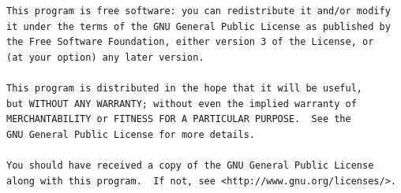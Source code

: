 \documentclass[a4paper,12pt]{article}
\begin{document}
\begin{verbatim}
This program is free software: you can redistribute it and/or modify
it under the terms of the GNU General Public License as published by
the Free Software Foundation, either version 3 of the License, or
(at your option) any later version.

This program is distributed in the hope that it will be useful,
but WITHOUT ANY WARRANTY; without even the implied warranty of
MERCHANTABILITY or FITNESS FOR A PARTICULAR PURPOSE.  See the
GNU General Public License for more details.

You should have received a copy of the GNU General Public License
along with this program.  If not, see <http://www.gnu.org/licenses/>.

\end{verbatim}
\end{document}
